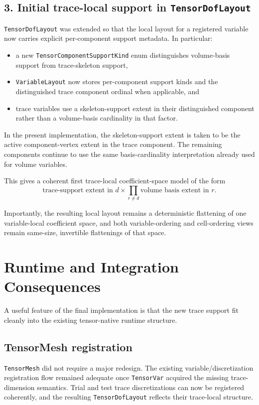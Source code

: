 \documentclass[11pt]{article}
\begin{document}
\subsection{3. Initial trace-local support in \texttt{TensorDofLayout}}

\texttt{TensorDofLayout} was extended so that the local layout for a registered variable now carries explicit per-component support metadata. In particular:
\begin{itemize}[leftmargin=2em]
  \item a new \texttt{TensorComponentSupportKind} enum distinguishes volume-basis support from trace-skeleton support,
  \item \texttt{VariableLayout} now stores per-component support kinds and the distinguished trace component ordinal when applicable, and
  \item trace variables use a skeleton-support extent in their distinguished component rather than a volume-basis cardinality in that factor.
\end{itemize}

In the present implementation, the skeleton-support extent is taken to be the active component-vertex extent in the trace component. The remaining components continue to use the same basis-cardinality interpretation already used for volume variables.

This gives a coherent first trace-local coefficient-space model of the form
\[
\text{trace-support extent in } d \times \prod_{r \ne d} \text{volume basis extent in } r.
\]

Importantly, the resulting local layout remains a deterministic flattening of one variable-local coefficient space, and both variable-ordering and cell-ordering views remain same-size, invertible flattenings of that space.

\section{Runtime and Integration Consequences}

A useful feature of the final implementation is that the new trace support fit cleanly into the existing tensor-native runtime structure.

\subsection{TensorMesh registration}

\texttt{TensorMesh} did not require a major redesign. The existing variable/discretization registration flow remained adequate once \texttt{TensorVar} acquired the missing trace-dimension semantics. Trial and test trace discretizations can now be registered coherently, and the resulting \texttt{TensorDofLayout} reflects their trace-local structure.
\end{document}
